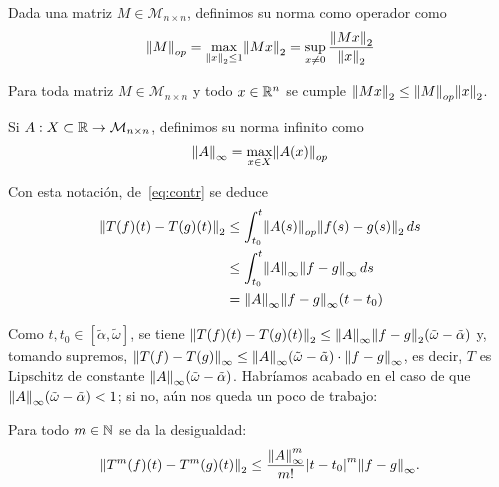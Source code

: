 \documentclass[../ecuaciones_diferenciales.tex]{subfiles}
\begin{document}
\begin{definition}
	Dada una matriz \(M \in \mathcal{M}_{n \times n}\), definimos su norma como operador como
	\[\norm{M}_{op} = \max_{\norm{x}_2 \leq 1} \norm{Mx}_2 = \sup_{x \neq 0}
		\frac{\norm{Mx}_2}{\norm{x}_2}\]
\end{definition}

\begin{remark}
	Para toda matriz \(M \in \mathcal{M}_{n \times n}\) y todo \(x \in \mathbb{R}^n\) se cumple
	\(\norm{Mx}_2 \leq \norm{M}_{op} \norm{x}_2\).
\end{remark}

\begin{definition}
	Si \(A : X \subset \mathbb{R} \to \mathcal{M}_{n \times n}\), definimos su norma infinito como
	\[\norm{A}_\infty = \max_{x \in X} \norm{A(x)}_{op}\]
\end{definition}

Con esta notación, de~\eqref{eq:contr} se deduce
\begin{align*}
	\norm{T(f)(t) - T(g)(t)}_2 & \leq \int_{t_0}^t
	\norm{A(s)}_{op}\norm{f(s)-g(s)}_2\dif s                               \\
	                           & \leq \int_{t_0}^t \norm{A}_\infty
	\norm{f-g}_\infty\dif s                                                \\
	                           & = \norm{A}_\infty\norm{f-g}_\infty(t-t_0)
\end{align*}

Como \(t, t_0 \in [\tilde{\alpha}, \tilde{\omega}]\), se tiene
\(\norm{T(f)(t)-T(g)(t)}_2 \leq
\norm{A}_\infty\norm{f-g}_2(\tilde{\omega}-\tilde{\alpha})\) y, tomando
supremos, \(\norm{T(f)-T(g)}_\infty \leq \norm{A}_\infty(\tilde{\omega} -
\tilde{\alpha}) \cdot \norm{f-g}_\infty\), es decir, \(T\) es Lipschitz de
constante \(\norm{A}_\infty(\tilde{\omega}-\tilde{\alpha})\). Habríamos
acabado en el caso de que \(\norm{A}_\infty(\tilde{\omega}-\tilde{\alpha}) <
1\); si no, aún nos queda un poco de trabajo:

\begin{lemma}\label{lem:desinfty}
	Para todo \(m \in \mathbb{N}\) se da la desigualdad:
	\[\norm{T^m(f)(t) - T^m(g)(t)}_2 \leq
		\frac{\norm{A}^m_\infty}{m!} \abs{t - t_0}^m \norm{f - g}_\infty.\]
\end{lemma}
\end{document}

